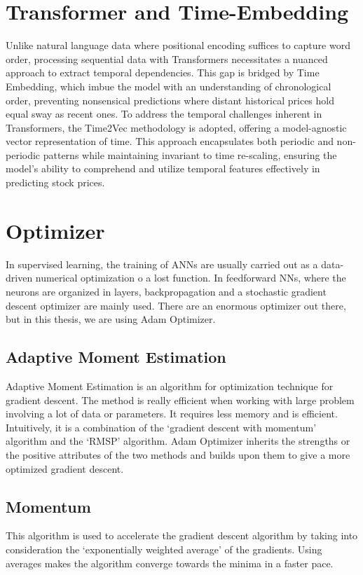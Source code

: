 \section{Transformer and Time-Embedding}

Unlike natural language data where positional encoding suffices to capture word
order, processing sequential data with Transformers necessitates a nuanced approach
to extract temporal dependencies. This gap is bridged by Time Embedding, which imbue
the model with an understanding of chronological order, preventing nonsensical
predictions where distant historical prices hold equal sway as recent ones. To address
the temporal challenges inherent in Transformers, the Time2Vec methodology is
adopted, offering a model-agnostic vector representation of time. This approach
encapsulates both periodic and non-periodic patterns while maintaining invariant
to time re-scaling, ensuring the model's ability to comprehend and utilize temporal
features effectively in predicting stock prices.

\section{Optimizer}
In supervised learning, the training of ANNs are usually carried out as a data-driven numerical optimization o
a lost function. In feedforward NNs, where the neurons are organized in layers, backpropagation and a stochastic gradient descent optimizer are mainly used. There are an enormous optimizer out there, but in this thesis, we are using Adam
Optimizer.

\subsection{Adaptive Moment Estimation}
Adaptive Moment Estimation is an algorithm for optimization technique for gradient
descent. The method is really efficient when working with large problem
involving a lot of data or parameters. It requires less memory and is efficient.
Intuitively, it is a combination of the ‘gradient descent with momentum’ algorithm
and the ‘RMSP’ algorithm. Adam Optimizer inherits the strengths or the positive
attributes of the two methods and builds upon them to give a more optimized
gradient descent.

\subsection{Momentum}
This algorithm is used to accelerate the gradient descent algorithm by taking
into consideration the ‘exponentially weighted average’ of the gradients. Using averages
makes the algorithm converge towards the minima in a faster pace.

